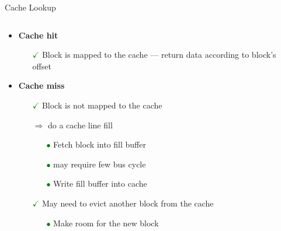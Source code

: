 \documentclass[aspectratio=169,12pt]{beamer}
\begin{document}
\begin{frame}{Cache Lookup}
\begin{columns}[T]
\begin{column}{0.6\textwidth}
\begin{itemize}
  \item \textbf{Cache hit}
  \begin{itemize}
    \item[\textcolor{green}{$\checkmark$}] Block is mapped to the cache —
    return data according to block's offset
  \end{itemize}
  
  \vspace{0.4cm}
  
  \item \textbf{Cache miss}
  \begin{itemize}
    \item[\textcolor{green}{$\checkmark$}] Block is not mapped to the cache
    \item[$\Rightarrow$] do a cache line fill
    \begin{itemize}
      \item[\textcolor{green}{$\bullet$}] Fetch block into fill buffer
      \item[\textcolor{green}{$\bullet$}] may require few bus cycle
      \item[\textcolor{green}{$\bullet$}] Write fill buffer into cache
    \end{itemize}
    \item[\textcolor{green}{$\checkmark$}] May need to evict another block
    from the cache
    \begin{itemize}
      \item[\textcolor{green}{$\bullet$}] Make room for the new block
    \end{itemize}
  \end{itemize}
\end{itemize}
\end{column}

\begin{column}{0.4\textwidth}
\end{column}
\end{columns}
\end{frame}
\end{document}
